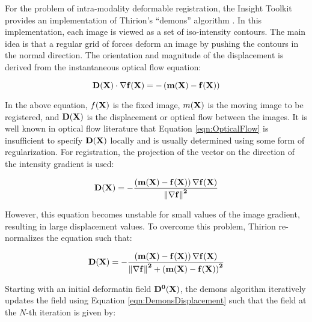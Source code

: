 %
%
%
%
%
%

For the problem of intra-modality deformable registration, the Insight
Toolkit provides an implementation of Thirion's ``demons'' algorithm
\cite{Thirion1995b,Thirion1998}. 
In this implementation, each image is viewed as a set of iso-intensity
contours.  The main idea is that a regular grid of forces deform an image by
pushing the contours in the normal direction.  The orientation and magnitude
of the displacement is derived from the instantaneous optical flow equation:

\begin{equation}
\bf{D}(\bf{X}) \cdot \nabla f(\bf{X}) = - \left(m(\bf{X}) - f(\bf{X}) \right)
\label{eqn:OpticalFlow}
\end{equation}

In the above equation, $f(\bf{X})$ is the fixed image, $m(\bf{X})$
is the moving image to be registered, and $\bf{D}(\bf{X})$ is the displacement 
or optical flow between the images. It is well known in optical flow
literature that Equation \ref{eqn:OpticalFlow} is insufficient to specify 
$\bf{D}(\bf{X})$ locally and is usually determined using some form of
regularization. For registration, the projection of the vector on the
direction of the intensity gradient is used:

\begin{equation}
\bf{D}(\bf{X}) = - \frac
{\left(  m(\bf{X}) - f(\bf{X}) \right) \nabla f(\bf{X})}
{\left\|  \nabla f \right\|^2 } 
\end{equation}

However, this equation becomes unstable for small values of the image gradient,
resulting in large displacement values. To overcome this problem, Thirion
re-normalizes the equation such that:

\begin{equation}
\bf{D}(\bf{X}) = - \frac
{\left(  m(\bf{X}) - f(\bf{X}) \right) \nabla f(\bf{X})}
{\left\|  \nabla f \right\|^2 + \left(  m(\bf{X}) - f(\bf{X}) \right)^2 } 
\label{eqn:DemonsDisplacement}
\end{equation}

Starting with an initial deformatin field $\bf{D}^{0}(\bf{X})$, the demons
algorithm iteratively updates the field using Equation
\ref{eqn:DemonsDisplacement} such that the field at the $N$-th iteration is
given by:

